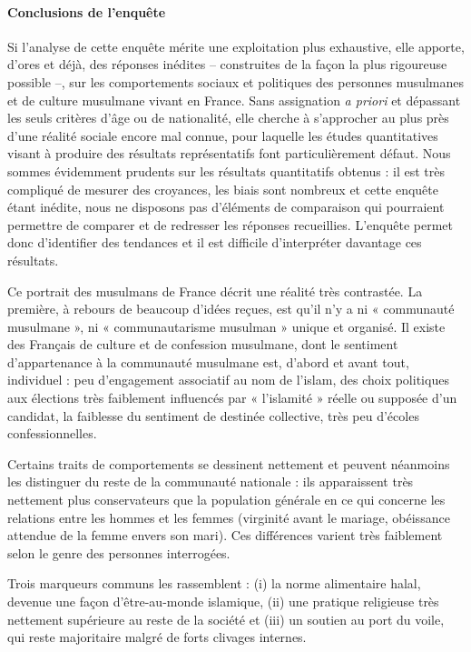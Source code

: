 \paragraph{Conclusions de l'enquête}


Si l'analyse de cette enquête mérite une exploitation plus exhaustive,
elle apporte, d'ores et déjà, des réponses inédites -- construites de la
façon la plus rigoureuse possible --, sur les comportements sociaux et
politiques des personnes musulmanes et de culture musulmane vivant en
France. Sans assignation \emph{a priori} et dépassant les seuls critères
d'âge ou de nationalité, elle cherche à s'approcher au plus près d'une
réalité sociale encore mal connue, pour laquelle les études
quantitatives visant à produire des résultats représentatifs font
particulièrement défaut. Nous sommes évidemment prudents sur les
résultats quantitatifs obtenus : il est très compliqué de mesurer des
croyances, les biais sont nombreux et cette enquête étant inédite, nous
ne disposons pas d'éléments de comparaison qui pourraient permettre de comparer et de redresser les
réponses recueillies. L'enquête permet donc d'identifier des tendances
et il est difficile d'interpréter davantage ces résultats.

Ce portrait des musulmans de France décrit une réalité très contrastée.
La première, à rebours de beaucoup d'idées reçues, est qu'il n'y a ni «
communauté musulmane », ni « communautarisme musulman » unique et organisé. Il existe des Français
de culture et de confession musulmane, dont le sentiment d'appartenance
à la communauté musulmane est, d'abord et avant tout, individuel : peu
d'engagement associatif au nom de l'islam, des choix politiques aux
élections très faiblement influencés par « l'islamité » réelle ou
supposée d'un candidat, la faiblesse du sentiment de destinée
collective, très peu d'écoles confessionnelles.

Certains traits de comportements se dessinent nettement et peuvent
néanmoins les distinguer du reste de la communauté nationale : ils
apparaissent très nettement plus conservateurs que la population
générale en ce qui concerne les relations entre les hommes et les femmes
(virginité avant le mariage, obéissance attendue de la femme envers son
mari). Ces différences varient très faiblement selon le genre des
personnes interrogées.
\begin{Synthesis}
Trois marqueurs communs les rassemblent : (i) la norme alimentaire
halal, devenue une façon d'être-au-monde islamique, (ii) une pratique
religieuse très nettement supérieure au reste de la société et (iii) un
soutien au port du voile, qui reste majoritaire malgré de forts clivages
internes.
\end{Synthesis}

